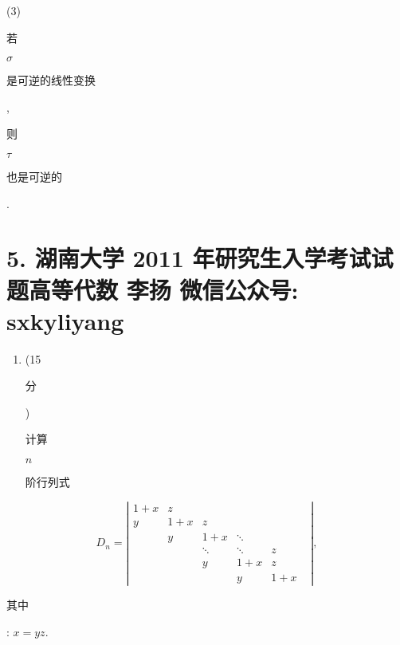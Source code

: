 \documentclass[10pt]{article}
\begin{document}
(3) \begin{CJK}{UTF8}{mj}若\end{CJK} $\sigma$ \begin{CJK}{UTF8}{mj}是可逆的线性变换\end{CJK}, \begin{CJK}{UTF8}{mj}则\end{CJK} $\tau$ \begin{CJK}{UTF8}{mj}也是可逆的\end{CJK}.

\section{5. 湖南大学 2011 年研究生入学考试试题高等代数 
 李扬 
 微信公众号: sxkyliyang}
\begin{enumerate}
  \item (15 \begin{CJK}{UTF8}{mj}分\end{CJK}) \begin{CJK}{UTF8}{mj}计算\end{CJK} $n$ \begin{CJK}{UTF8}{mj}阶行列式\end{CJK}
\end{enumerate}
$$
D_{n}=\left|\begin{array}{cccccc}
1+x & z & & & & \\
y & 1+x & z & & & \\
& y & 1+x & \ddots & & \\
& & \ddots & \ddots & z & \\
& & y & 1+x & z \\
& & & y & 1+x
\end{array}\right|,
$$
\begin{CJK}{UTF8}{mj}其中\end{CJK}: $x=y z$.
\end{document}
